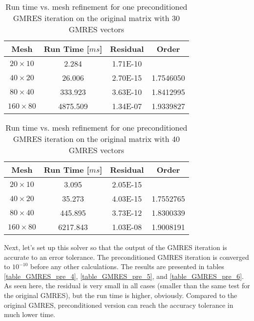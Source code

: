 \documentclass{article}
\begin{document}
\begin{table}[H]
\centering
\caption{Run time vs. mesh refinement for one preconditioned GMRES iteration on the original matrix with 30 GMRES vectors}
\label{table_GMRES_pre_2}
\begin{tabular}{cccc}
\hline
Mesh & Run Time [$m s$] & Residual & Order\\
\hline\hline
$20 \times 10$  & 2.284    & 1.71E-10 &           \\
$40 \times 20$  & 26.006   & 2.70E-15 & 1.7546050 \\
$80 \times 40$  & 333.923  & 3.63E-10 & 1.8412995 \\
$160 \times 80$ & 4875.509 & 1.34E-07 & 1.9339827 \\
\hline
\end{tabular}
\end{table}

\begin{table}[H]
\centering
\caption{Run time vs. mesh refinement for one preconditioned  GMRES iteration on the original matrix with 40 GMRES vectors}
\label{table_GMRES_pre_3}
\begin{tabular}{cccc}
\hline
Mesh & Run Time [$m s$] & Residual & Order\\
\hline\hline
$20 \times 10$  & 3.095    & 2.05E-15 &           \\
$40 \times 20$  & 35.273   & 4.03E-15 & 1.7552765 \\
$80 \times 40$  & 445.895  & 3.73E-12 & 1.8300339 \\
$160 \times 80$ & 6217.843 & 1.03E-08 & 1.9008191 \\
\hline
\end{tabular}
\end{table}

Next, let's set up this solver so that the output of the GMRES iteration is accurate to an error tolerance. The preconditioned GMRES iteration is converged to $10^{-10}$ before any other calculations. The results are presented in tables \ref{table_GMRES_pre_4}, \ref{table_GMRES_pre_5}, and \ref{table_GMRES_pre_6}. As seen here, the residual is very small in all cases (smaller than the same test for the original GMRES), but the run time is higher, obviously. Compared to the original GMRES, preconditioned version can reach the accuracy tolerance in much lower time.
\end{document}
